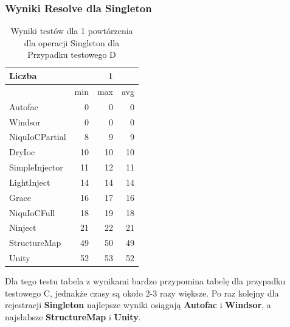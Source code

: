 \documentclass[12pt]{article}
\begin{document}
\subsubsection{Wyniki Resolve dla Singleton}
\begin{table}[H]
\captionsetup{belowskip=0pt,aboveskip=0pt}
\begin{center}
\begin{small}
	\begin{tabular}{ | l | r r r | }
    		\hline
Liczba & & 1 & \\ \hline
 & min & max & avg \\ \hline
Autofac & 0 & 0 & 0 \\ \hline
Windsor & 0 & 0 & 0 \\ \hline
NiquIoCPartial & 8 & 9 & 9 \\ \hline
DryIoc & 10 & 10 & 10 \\ \hline
SimpleInjector & 11 & 12 & 11 \\ \hline
LightInject & 14 & 14 & 14 \\ \hline
Grace & 16 & 17 & 16 \\ \hline
NiquIoCFull & 18 & 19 & 18 \\ \hline
Ninject & 21 & 22 & 21 \\ \hline
StructureMap & 49 & 50 & 49 \\ \hline
Unity & 52 & 53 & 52 \\ \hline
  	\end{tabular}
\end{small}
\end{center}
\caption{Wyniki testów dla 1 powtórzenia dla operacji Singleton dla Przypadku testowego D}
\label{TestCaseD_Singleton1}
\end{table}
Dla tego testu tabela z wynikami bardzo przypomina tabelę dla przypadku testowego C, jednakże czasy są około 2-3 razy większe. Po raz kolejny dla rejestracji \textbf{Singleton} najlepsze wyniki osiągają \textbf{Autofac} i \textbf{Windsor}, a najsłabsze \textbf{StructureMap} i \textbf{Unity}.
\\ \\
\end{document}
